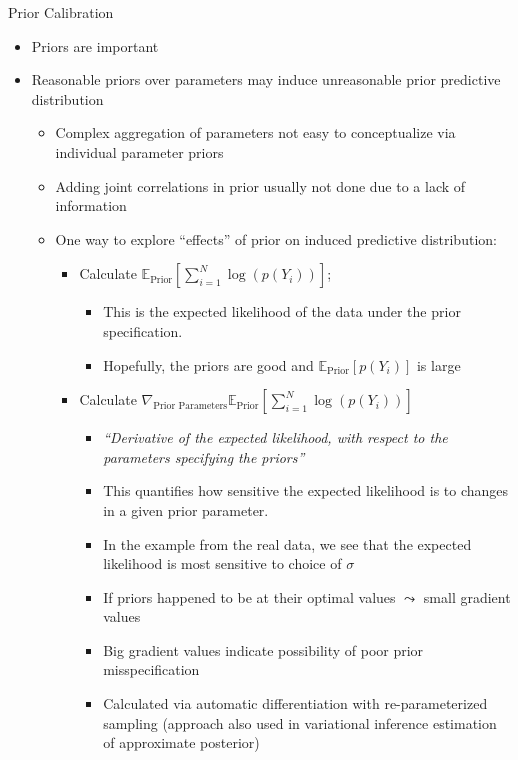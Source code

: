 \documentclass[11pt,letterpaper]{article}
\theoremstyle{plain}
\newcommand{\E}{\mathbb{E}}
\begin{document}
{{\sc Prior Calibration}
\begin{itemize}
\item Priors are important 
\item Reasonable priors over parameters may induce unreasonable prior predictive distribution 
\begin{itemize}
\item Complex aggregation of parameters not easy to conceptualize via individual parameter priors 
\item Adding joint correlations in prior usually not done due to a lack of information
\item One way to explore ``effects'' of prior on induced predictive distribution: 
\begin{itemize}
\item Calculate $\E_{\textrm{Prior}}\left[ \sum_{i=1}^N \log(p(Y_i))\right]$;
\begin{itemize}
\item This is the expected likelihood of the data under the prior specification. 
\item Hopefully, the priors are good and $\E_{\textrm{Prior}}[ p(Y_i)]$ is large 
\end{itemize}
\item Calculate $\nabla_{\textrm{Prior Parameters}} \E_{\textrm{Prior}}\left[ \sum_{i=1}^N \log(p(Y_i))\right]$
\begin{itemize}
\item {\it ``Derivative of the expected likelihood, with respect to the parameters specifying the priors'' }
\item This quantifies how sensitive the expected likelihood is to changes in a given prior parameter. 
\item In the example from the real data, we see that the expected likelihood is most sensitive to choice of $\sigma$ 
\item If priors happened to be at their optimal values $\leadsto$ small gradient values 
\item Big gradient values indicate possibility of poor prior misspecification 
\item Calculated via automatic differentiation with re-parameterized sampling (approach also used in variational inference estimation of approximate posterior)
\end{itemize}
\end{itemize}
\end{itemize}
\end{itemize}

}
\end{document}
